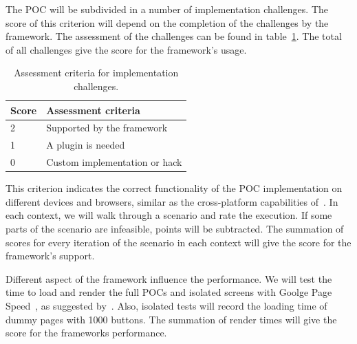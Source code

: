 \documentclass[a4paper]{artikel3}
\newcommand{\setspace}[0]{\vspace{2mm}}
\renewcommand{\paragraph}[1]{\setspace \noindent {\bf #1}  }
\begin{document}
\paragraph{Usage}
The POC will be subdivided in a number of implementation challenges.  
The score of this criterion will depend on the completion of the challenges by the framework.  
The assessment of the challenges can be found in table~\ref{table:challenges-scores}.  
The total of all challenges give the score for the framework's usage.

\begin{table}[h]	
\centering
\begin{tabular}{ll}
\toprule
\textbf{Score} & \textbf{Assessment criteria}\\
\midrule
2 & Supported by the framework\\
1 & A plugin is needed\\
0 & Custom implementation or hack\\
\bottomrule
\end{tabular}
\caption{Assessment criteria for implementation challenges.}
\label{table:challenges-scores}
\end{table}


\paragraph{Support}
This criterion indicates the correct functionality of the POC implementation on different devices and browsers,  similar as the cross-platform capabilities of~\cite{Sarrafi2012a}.  
In each context,  we will walk through a scenario and rate the execution.  
If some parts of the scenario are infeasible,  points will be subtracted.  
The summation of scores for every iteration of the scenario in each context will give the score for the framework's support.

\paragraph{Performance}
Different aspect of the framework influence the performance.  
We will test the time to load and render the full POCs and isolated screens with Goolge Page Speed~\cite{Google2012},  as suggested by~\cite{Morgan2011}.   
Also,  isolated tests will record the loading time of dummy pages with 1000 buttons.  
The summation of render times will give the score for the frameworks performance.

\end{document}
